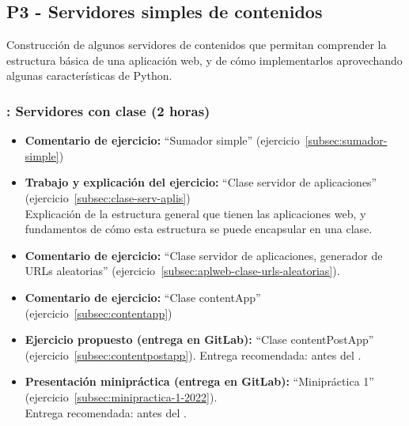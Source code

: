 \documentclass[a4paper,12pt]{article}
\begin{document}
\subsection{P3 - Servidores simples de contenidos}

Construcción de algunos servidores de contenidos que permitan comprender la estructura básica de una aplicación web, y de cómo implementarlos aprovechando algunas características de Python.

\subsubsection{\juevesF: Servidores con clase (2 horas)}
\label{cal:juevesF}

\begin{itemize}
\item \textbf{Comentario de ejercicio:} ``Sumador simple'' (ejercicio~\ref{subsec:sumador-simple}) 
\item \textbf{Trabajo y explicación del ejercicio:} ``Clase servidor de aplicaciones'' (ejercicio~\ref{subsec:clase-serv-aplis}) \\
  Explicación de la estructura general que tienen las aplicaciones web, y fundamentos de cómo esta estructura se puede encapsular en una clase.
\item \textbf{Comentario de ejercicio:} ``Clase servidor de aplicaciones, generador de URLs aleatorias'' (ejercicio~\ref{subsec:aplweb-clase-urls-aleatorias}). 
 \item \textbf{Comentario de ejercicio:}  ``Clase contentApp'' (ejercicio~\ref{subsec:contentapp}) 
 \item \textbf{Ejercicio propuesto (entrega en GitLab):} ``Clase contentPostApp'' (ejercicio~\ref{subsec:contentpostapp}).
  Entrega recomendada: antes del \juevesG.
  \item \textbf{Presentación minipráctica (entrega en GitLab):} ``Minipráctica 1'' (ejercicio~\ref{subsec:minipractica-1-2022}). \\
    Entrega recomendada: antes del \juevesH.
\end{itemize}


\end{document}
